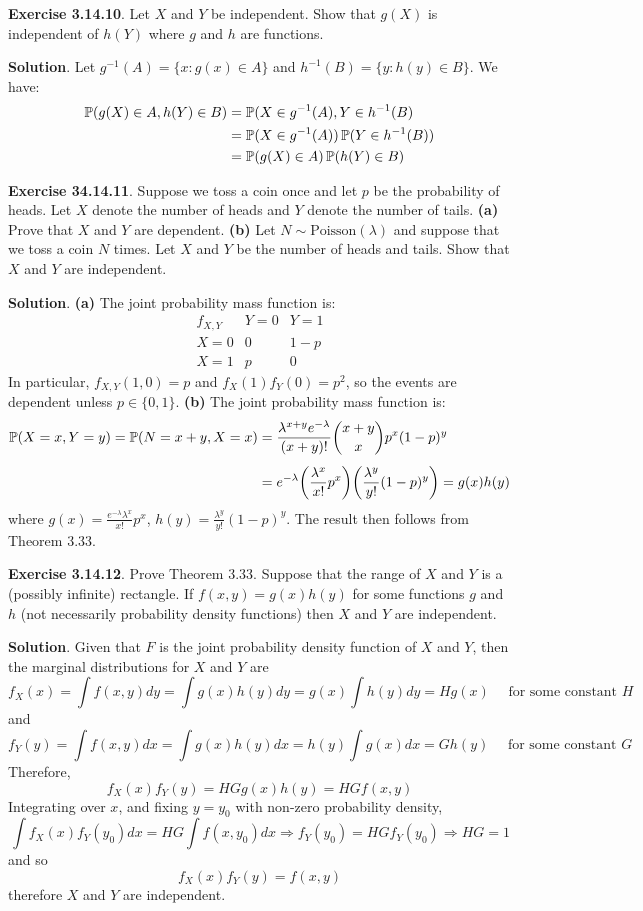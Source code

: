 \textbf{Exercise 3.14.10}. Let \(X\) and \(Y\) be independent. Show that
\(g(X)\) is independent of \(h(Y)\) where \(g\) and \(h\) are functions.

\textbf{Solution}. Let \(g^{-1}(A) = \{ x : g(x) \in A \}\) and
\(h^{-1}(B) = \{ y : h(y) \in B \}\). We have:
\begin{align*}
\operatorname{\mathbb{P}}(g(X) \in A, h(Y) \in B) 
& = \operatorname{\mathbb{P}}(X \in g^{-1}(A), Y \in h^{-1}(B) 
\\
& = \operatorname{\mathbb{P}}(X \in g^{-1}(A)) \operatorname{\mathbb{P}}(Y \in h^{-1}(B)) 
\\
& = \operatorname{\mathbb{P}}(g(X) \in A) \operatorname{\mathbb{P}}(h(Y) \in B)
\end{align*}

\textbf{Exercise 34.14.11}. Suppose we toss a coin once and let \(p\) be
the probability of heads. Let \(X\) denote the number of heads and \(Y\)
denote the number of tails.
\textbf{(a)} Prove that \(X\) and \(Y\) are dependent.
\textbf{(b)} Let \(N \sim \text{Poisson}(\lambda)\) and suppose that we
toss a coin \(N\) times. Let \(X\) and \(Y\) be the number of heads and
tails. Show that \(X\) and \(Y\) are independent.

\textbf{Solution}.
\textbf{(a)} The joint probability mass function is:
\[
\begin{array}{c|cc}
f_{X, Y} & Y = 0 & Y = 1 \\
\hline
X = 0 & 0 & 1 - p\\
X = 1 & p & 0
\end{array}
\]
In particular, \(f_{X, Y}(1, 0) = p\) and \(f_X(1) f_Y(0) = p^{2}\), so
the events are dependent unless \(p \in \{0, 1\}\).
\textbf{(b)} The joint probability mass function is:
\begin{align*}
\PROB(X = x, Y = y) 
  = \PROB(N = x + y, X = x) 
& = \frac{\lambda^{x+y}e^{-\lambda}}{(x + y)!} \binom{x + y}{x} p^x (1-p)^y 
\\[
1ex]
& = e^{-\lambda} \left(\frac{\lambda^x}{x!} p^x \right) \left(\frac{\lambda^y}{y!} (1 - p)^y\right) 
  = g(x) h(y)
\end{align*}
where \(g(x) =  \frac{e^{-\lambda}\lambda^x}{x!} p^{x}\), 
\(h(y) = \frac{\lambda^y}{y!} (1 - p)^{y} \). 
The result then follows from Theorem 3.33.

\textbf{Exercise 3.14.12}. Prove Theorem 3.33.
Suppose that the range of \(X\) and \(Y\) is a (possibly infinite)
rectangle. If \(f(x, y) = g(x) h(y)\) for some functions \(g\) and \(h\)
(not necessarily probability density functions) then \(X\) and \(Y\) are
independent.

\textbf{Solution}.
Given that \(F\) is the joint probability density function of \(X\) and
\(Y\), then the marginal distributions for \(X\) and \(Y\) are
\[
f_X(x) = \int f(x, y) dy = \int g(x) h(y) dy = g(x) \int h(y) dy = H g(x) \quad \text{ for some constant } H
\]
and
\[
f_Y(y) = \int f(x, y) dx = \int g(x) h(y) dx = h(y) \int g(x) dx = G h(y) \quad \text{ for some constant } G
\]
Therefore,
\[
f_X(x) f_Y(y) = HG g(x) h(y) = HG f(x, y)
\]
Integrating over \(x\), and fixing \(y = y_{0}\) with non-zero probability
density,
\[
\int f_X(x) f_Y(y_{0}) dx = HG \int f(x, y_{0}) dx \Longrightarrow f_Y(y_{0}) = HG f_Y(y_{0}) \Longrightarrow HG = 1
\]
and so
\[
f_X(x) f_Y(y) = f(x, y)
\]
therefore \(X\) and \(Y\) are independent.

